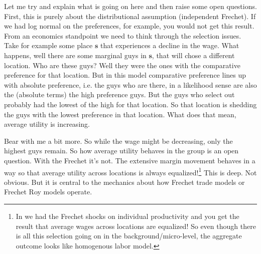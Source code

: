 \documentclass[pdftex,12pt]{article}
\begin{document}
\medskip
\noindent Let me try and explain what is going on here and then raise some open questions. First, this is purely about the distributional assumption (independent Frechet). If we had log normal on the preferences, for example, you would not get this result. From an economics standpoint we need to think through the selection issues. Take for example some place $\textbf{s}$ that experiences a decline in the wage. What happens, well there are some marginal guys in $\textbf{s}$, that will chose a different location. Who are these guys? Well they were the ones with the comparative preference for that location. But in this model comparative preference lines up with absolute preference, i.e. the guys who are there, in a likelihood sense are also the (absolute terms) the high preference guys. But the guys who select out probably had the lowest of the high for that location. So that location is shedding the guys with the lowest preference in that location. What does that mean, average utility is increasing. 

\medskip
\noindent Bear with me a bit more. So while the wage might be decreasing, only the highest guys remain. So how average utility behaves in the group is an open question. With the Frechet it's not. The extensive margin movement behaves in a way so that average utility across locations is always equalized!\footnote{In \citet{lagakos2013selection} we had the Frechet shocks on individual productivity and you get the result that average wages across locations are equalized! So even though there is all this selection going on in the background/micro-level, the aggregate outcome looks like homogenous labor model.} This is deep. Not obvious. But it is central to the mechanics about how Frechet trade models or Frechet Roy models operate.
\end{document}
